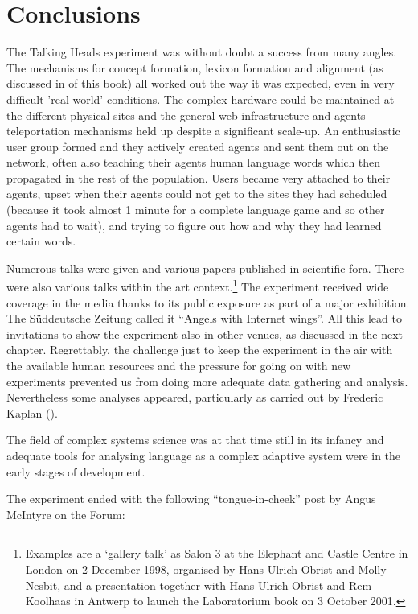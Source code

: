 \section{Conclusions} 

The Talking Heads experiment was without doubt a success from many angles. The mechanisms for concept formation,
lexicon formation and alignment (as discussed in  of this book) all worked out the 
way it was expected, even in very difficult 'real world' conditions. The complex hardware could be maintained at the 
different physical sites and the general web infrastructure and agents teleportation mechanisms held up despite a 
significant scale-up. An enthusiastic user group formed and they actively created agents and sent 
them out on the network, often also teaching their agents human language words which then propagated
in the rest of the population. Users became very attached to their agents, upset when their agents could not get 
to the sites they had scheduled (because it took almost 1 minute for a complete language game and so other agents 
had to wait), and trying to figure out how and why they had learned certain words. 

Numerous talks were given and various papers published in scientific fora. There were also various talks within 
the art context.\footnote{Examples are a `gallery talk' as Salon 3 at the Elephant and Castle Centre
in London on 2 December 1998, organised by Hans Ulrich Obrist and Molly Nesbit, and a presentation together with 
Hans-Ulrich Obrist and Rem Koolhaas in Antwerp to launch the Laboratorium book on 3 October 2001.}
The experiment received wide coverage in 
the media thanks to its public exposure as part of a major exhibition. The Süddeutsche Zeitung called it 
``Angels with Internet wings''. All this lead to invitations to show the experiment
also in other venues, as discussed in the next chapter. 
Regrettably, the challenge just to keep the experiment in the air with the available human resources
and the pressure for going on with new experiments prevented us from doing more adequate data gathering 
and analysis. Nevertheless some analyses appeared, particularly as carried out by Frederic Kaplan (\citealt{Kaplan:2001}). 

The field of complex systems science was at that time still in its infancy and 
adequate tools for analysing language as a complex adaptive system were in the early stages of development. 

The experiment ended with the following ``tongue-in-cheek'' post by Angus McIntyre on the Forum:

